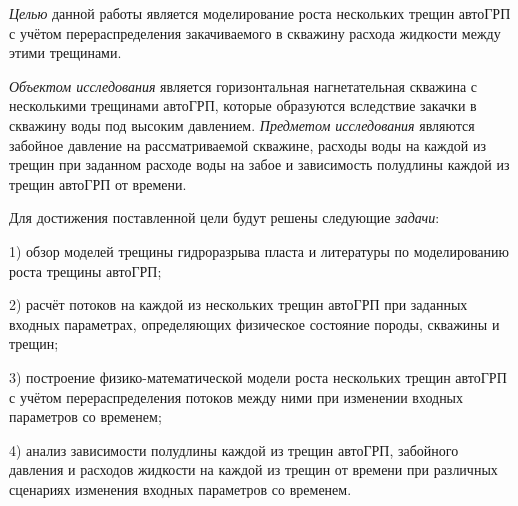 \emph{Целью} данной работы является моделирование роста нескольких трещин автоГРП с учётом перераспределения закачиваемого в скважину расхода жидкости между этими трещинами.

\emph{Объектом исследования} является горизонтальная нагнетательная скважина с несколькими трещинами автоГРП, которые образуются вследствие закачки в скважину воды под высоким давлением. 
\emph{Предметом исследования} являются забойное давление на рассматриваемой скважине, расходы воды на каждой из трещин при заданном расходе воды на забое и зависимость полудлины каждой из трещин автоГРП от времени.

Для достижения поставленной цели будут решены следующие \emph{задачи}:

1) обзор моделей трещины гидроразрыва пласта и литературы по моделированию роста трещины автоГРП;

2) расчёт потоков на каждой из нескольких трещин автоГРП при заданных входных параметрах, определяющих физическое состояние породы, скважины и трещин;

3) построение физико-математической модели роста нескольких трещин автоГРП с учётом перераспределения потоков между ними при изменении входных параметров со временем;

4) анализ зависимости полудлины каждой из трещин автоГРП, забойного давления и расходов жидкости на каждой из трещин от времени при различных сценариях изменения входных параметров со временем.
